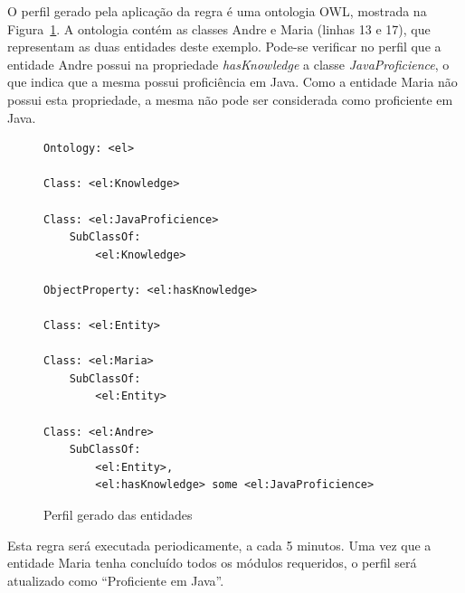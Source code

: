 O perfil gerado pela aplicação da regra é uma ontologia OWL, mostrada na Figura~\ref{fig:perfil_gerado}. A ontologia contém as classes Andre e Maria (linhas 13 e 17), que representam as duas entidades deste exemplo. Pode-se verificar no perfil que a entidade Andre possui na propriedade {\em hasKnowledge} a classe {\em JavaProficience}, o que indica que a mesma possui proficiência em Java. Como a entidade Maria não possui esta propriedade, a mesma não pode ser considerada como proficiente em Java.

\begin{figure}[!t]
\begin{lstlisting}
Ontology: <el>

Class: <el:Knowledge>
    
Class: <el:JavaProficience>
    SubClassOf: 
        <el:Knowledge>
    
ObjectProperty: <el:hasKnowledge>
    
Class: <el:Entity>
    
Class: <el:Maria>
    SubClassOf: 
        <el:Entity>
    
Class: <el:Andre>
    SubClassOf: 
        <el:Entity>,
        <el:hasKnowledge> some <el:JavaProficience>\end{lstlisting}
\caption{Perfil gerado das entidades}
\label{fig:perfil_gerado}
\end{figure}


Esta regra será executada periodicamente, a cada 5 minutos. Uma vez que a entidade Maria tenha concluído todos os módulos requeridos, o perfil será atualizado como ``Proficiente em Java''.
